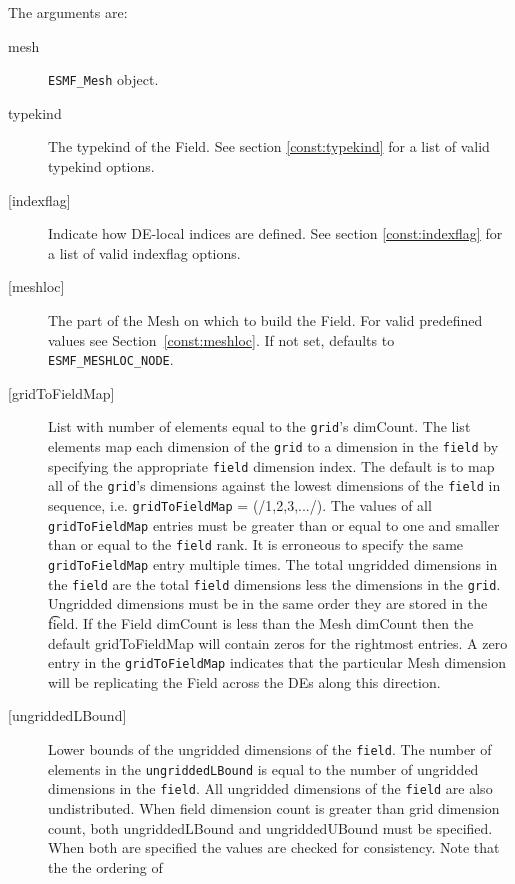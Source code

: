    The arguments are:
   \begin{description}
   \item [mesh]
   {\tt ESMF\_Mesh} object.
   \item [typekind]
   The typekind of the Field. See section \ref{const:typekind}
   for a list of valid typekind options.
   \item [{[indexflag]}]
   Indicate how DE-local indices are defined. See section
   \ref{const:indexflag} for a list of valid indexflag options.
   \item [{[meshloc]}]
   \begin{sloppypar}
   The part of the Mesh on which to build the Field. For valid
   predefined values see Section~\ref{const:meshloc}.
   If not set, defaults to {\tt ESMF\_MESHLOC\_NODE}.
   \end{sloppypar}
   \item [{[gridToFieldMap]}]
   List with number of elements equal to the
   {\tt grid}'s dimCount. The list elements map each dimension
   of the {\tt grid} to a dimension in the {\tt field} by
   specifying the appropriate {\tt field} dimension index. The default is to
   map all of the {\tt grid}'s dimensions against the lowest dimensions of
   the {\tt field} in sequence, i.e. {\tt gridToFieldMap} = (/1,2,3,.../).
   The values of all {\tt gridToFieldMap} entries must be greater than or equal
   to one and smaller than or equal to the {\tt field} rank.
   It is erroneous to specify the same {\tt gridToFieldMap} entry
   multiple times. The total ungridded dimensions in the {\tt field}
   are the total {\tt field} dimensions less
   the dimensions in
   the {\tt grid}. Ungridded dimensions must be in the same order they are
   stored in the {\t field}.
   If the Field dimCount is less than the Mesh dimCount then the default
   gridToFieldMap will contain zeros for the rightmost entries. A zero
   entry in the {\tt gridToFieldMap} indicates that the particular
   Mesh dimension will be replicating the Field across the DEs along
   this direction.
   \item [{[ungriddedLBound]}]
   Lower bounds of the ungridded dimensions of the {\tt field}.
   The number of elements in the {\tt ungriddedLBound} is equal to the number of ungridded
   dimensions in the {\tt field}. All ungridded dimensions of the
   {\tt field} are also undistributed. When field dimension count is
   greater than grid dimension count, both ungriddedLBound and ungriddedUBound
   must be specified. When both are specified the values are checked
   for consistency. Note that the the ordering of

\end{description}
